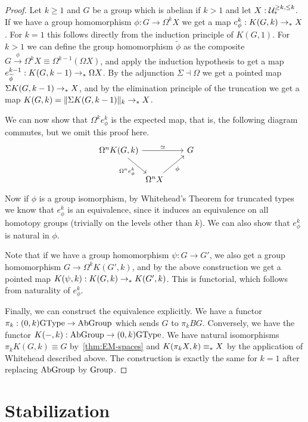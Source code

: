 \begin{proof}
  Let $k\ge1$ and $G$ be a group which is abelian if $k>1$ and let $X:\UU_\pt^{\ge k,\le k}$. If we have a group homomorphism $\phi : G \to \Omega^k X$ we get a map $e_\phi^k:K(G,k)\to_\pt X$. For $k=1$ this follows directly from the induction principle of $K(G,1)$. For $k>1$ we can define the group homomorphism $\widetilde\phi$ as the composite $G \xrightarrow{\phi} \Omega^k X \equiv \Omega^{k-1}(\Omega X)$, and apply the induction hypothesis to get a map
  $e_{\widetilde\phi}^{k-1}:K(G,k-1)\to_\pt \Omega X$. By the adjunction $\Sigma\dashv\Omega$ we get a pointed map $\Sigma K(G,k-1)\to_\pt X$, and by the elimination principle of the truncation we get a map $K(G,k)=\trunc{k}{\Sigma K(G,k-1)}\to_\pt X$. 

  We can now show that $\Omega^k e_\phi^k$ is the expected map, that is, the following diagram commutes, but we omit this proof here.
\begin{equation*}
\begin{tikzcd}[column sep=0]
\Omega^nK(G,k) \arrow[rr,"\eqvsym"] \arrow[dr,swap,"\Omega^n e_\phi^k"] & & G \\
& \Omega^n X \arrow[ur,swap,"\phi"] & \phantom{\Omega^nK(G,k)}
\end{tikzcd}
\end{equation*}
  Now if $\phi$ is a group isomorphism, by Whitehead's Theorem for truncated types \cite[Theorem 8.8.3]{hottbook} we know that $e_\phi^k$ is an equivalence, since it induces an equivalence on all homotopy groups (trivially on the levels other than $k$). We can also show that $e_\phi^k$ is natural in $\phi$.

  Note that if we have a group homomorphism $\psi:G\to G'$, we also get a group homomorphism $G\to\Omega^k K(G',k)$, and by the above construction we get a pointed map $K(\psi,k):K(G,k)\to_\pt K(G',k)$. This is functorial, which follows from naturality of $e_\phi^k$. 

  Finally, we can construct the equivalence explicitly. We have a functor
  $\pi_k:(0,k)\GType \to \AbGroup$ which sends $G$ to $\pi_k BG$. Conversely, we have the functor $K({-},k):\AbGroup\to (0,k)\GType$. We have natural isomorphisms
  $\pi_k K(G,k)\equiv G$ by~\autoref{thm:EM-spaces} and $K(\pi_k X,k)\equiv_\pt X$ by the application of Whitehead described above. The construction is exactly the same for $k=1$ after replacing $\AbGroup$ by $\Group$.
\end{proof}

\section{Stabilization}
\label{sec:stabilization}

